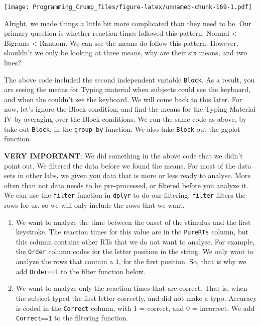 \documentclass[]{book}
\theoremstyle{definition}
\theoremstyle{definition}
\theoremstyle{definition}
\theoremstyle{remark}
\begin{document}
\texttt{[image: Programming\_Crump\_files/figure-latex/unnamed-chunk-169-1.pdf]}

Alright, we made things a little bit more complicated than they need to
be. Our primary question is whether reaction times followed this
pattern: Normal \textless{} Bigrams \textless{} Random. We can see the
means do follow this pattern. However, shouldn't we only be looking at
three means, why are their six means, and two lines?

The above code included the second independent variable \texttt{Block}.
As a result, you are seeing the means for Typing material when subjects
could see the keyboard, and when the couldn't see the keyboard. We will
come back to this later. For now, let's ignore the Block condition, and
find the means for the Typing Material IV by averaging over the Block
conditions. We run the same code as above, by take out \texttt{Block},
in the \texttt{group\_by} function. We also take \texttt{Block} out the
ggplot function.

\textbf{VERY IMPORTANT}: We did something in the above code that we
didn't point out. We filtered the data before we found the means. For
most of the data sets in other labs, we given you data that is more or
less ready to analyse. More often than not data needs to be
pre-processed, or filtered before you analyze it. We can use the
\texttt{filter} function in \texttt{dplyr} to do our filtering.
\texttt{filter} filters the rows for us, so we will only include the
rows that we want.

\begin{enumerate}
\def\labelenumi{\arabic{enumi}.}
\item
  We want to analyze the time between the onset of the stimulus and the
  first keystroke. The reaction times for this value are in the
  \texttt{PureRTs} column, but this column contains other RTs that we do
  not want to analyse. For example, the \texttt{Order} column codes for
  the letter position in the string. We only want to analyze the rows
  that contain a \texttt{1}, for the first position. So, that is why we
  add \texttt{Order==1} to the filter function below.
\item
  We want to analyze only the reaction times that are correct. That is,
  when the subject typed the first letter correctly, and did not make a
  typo. Accuracy is coded in the \texttt{Correct} column, with 1 =
  correct, and 0 = incorrect. We add \texttt{Correct==1} to the
  filtering function.
\end{enumerate}
\end{document}
